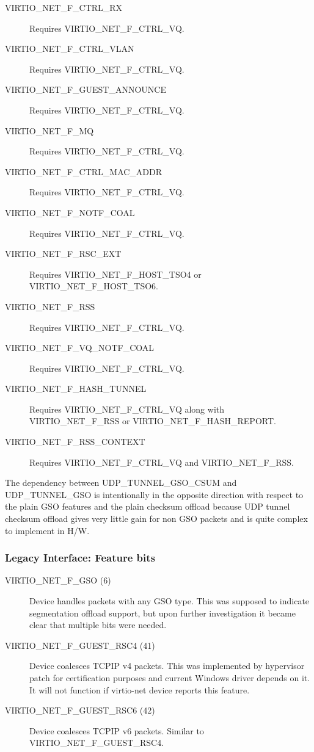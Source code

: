 \begin{description}
\item[VIRTIO_NET_F_CTRL_RX] Requires VIRTIO_NET_F_CTRL_VQ.
\item[VIRTIO_NET_F_CTRL_VLAN] Requires VIRTIO_NET_F_CTRL_VQ.
\item[VIRTIO_NET_F_GUEST_ANNOUNCE] Requires VIRTIO_NET_F_CTRL_VQ.
\item[VIRTIO_NET_F_MQ] Requires VIRTIO_NET_F_CTRL_VQ.
\item[VIRTIO_NET_F_CTRL_MAC_ADDR] Requires VIRTIO_NET_F_CTRL_VQ.
\item[VIRTIO_NET_F_NOTF_COAL] Requires VIRTIO_NET_F_CTRL_VQ.
\item[VIRTIO_NET_F_RSC_EXT] Requires VIRTIO_NET_F_HOST_TSO4 or VIRTIO_NET_F_HOST_TSO6.
\item[VIRTIO_NET_F_RSS] Requires VIRTIO_NET_F_CTRL_VQ.
\item[VIRTIO_NET_F_VQ_NOTF_COAL] Requires VIRTIO_NET_F_CTRL_VQ.
\item[VIRTIO_NET_F_HASH_TUNNEL] Requires VIRTIO_NET_F_CTRL_VQ along with VIRTIO_NET_F_RSS or VIRTIO_NET_F_HASH_REPORT.
\item[VIRTIO_NET_F_RSS_CONTEXT] Requires VIRTIO_NET_F_CTRL_VQ and VIRTIO_NET_F_RSS.
\end{description}

\begin{note}
The dependency between UDP_TUNNEL_GSO_CSUM and UDP_TUNNEL_GSO is intentionally
in the opposite direction with respect to the plain GSO features and the plain
checksum offload because UDP tunnel checksum offload gives very little gain
for non GSO packets and is quite complex to implement in H/W.
\end{note}

\subsubsection{Legacy Interface: Feature bits}\label{sec:Device Types / Network Device / Feature bits / Legacy Interface: Feature bits}
\begin{description}
\item[VIRTIO_NET_F_GSO (6)] Device handles packets with any GSO type. This was supposed to indicate segmentation offload support, but
upon further investigation it became clear that multiple bits were needed.
\item[VIRTIO_NET_F_GUEST_RSC4 (41)] Device coalesces TCPIP v4 packets. This was implemented by hypervisor patch for certification
purposes and current Windows driver depends on it. It will not function if virtio-net device reports this feature.
\item[VIRTIO_NET_F_GUEST_RSC6 (42)] Device coalesces TCPIP v6 packets. Similar to VIRTIO_NET_F_GUEST_RSC4.
\end{description}

